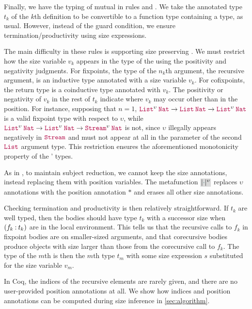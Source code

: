 Finally, we have the typing of mutual \cofixpoints in rules  and .
We take the annotated type $t_k$ of the $k$th \cofixpoint definition to be convertible to a function type containing a \coinductive type, as usual.
However, instead of the guard condition, we ensure termination/productivity using size expressions.

The main difficulty in these rules is supporting size preserving \cofixpoints.
We must restrict how the size variable $v_k$ appears in the type of the \cofixpoints using the positivity and negativity judgments.
For fixpoints, the type of the $n_k$th argument, the recursive argument, is an inductive type annotated with a size variable $v_k$.
For cofixpoints, the return type is a coinductive type annotated with $v_k$.
The positivity or negativity of $v_k$ in the rest of $t_k$ indicate where $v_k$ may occur other than in the \corecursive position.
For instance, supposing that $n = 1$,
$\app{\List^\upsilon}{\Nat} \to \app{\List}{\Nat} \to \app{\List^\upsilon}{\Nat}$
is a valid fixpoint type with respect to $\upsilon$, while
$\app{\List^\upsilon}{\Nat} \to \app{\List^\upsilon}{\Nat} \to \app{\Stream^\upsilon}{\Nat}$
is not, since $\upsilon$ illegally appears negatively in $\Stream$ and must not appear at all in the parameter of the second $\List$ argument type.
This restriction ensures the aforementioned monotonicity property of the \cofixpoints' types.

As in , to maintain subject reduction, we cannot keep the size annotations, instead replacing them with position variables.
The metafunction $\new{\erase{\ph}^\upsilon}$ replaces $\upsilon$ annotations with the position annotation $\ast$ and erases all other size annotations.

Checking termination and productivity is then relatively straightforward.
If $t_k$ are well typed, then the \cofixpoint bodies should have type $t_k$ with a successor size when $(f_k \mathbin{:} t_k)$ are in the local environment.
This tells us that the recursive calls to $f_k$ in fixpoint bodies are on smaller-sized arguments, and that corecursive bodies produce objects with size larger than those from the corecursive call to $f_k$.
The type of the $m$th \cofixpoint is then the $m$th type $t_m$ with some size expression $s$ substituted for the size variable $v_m$.

In Coq, the indices of the recursive elements are rarely given, and there are no user-provided position annotations at all.
We show how indices and position annotations can be computed during size inference in \autoref{sec:algorithm}.

